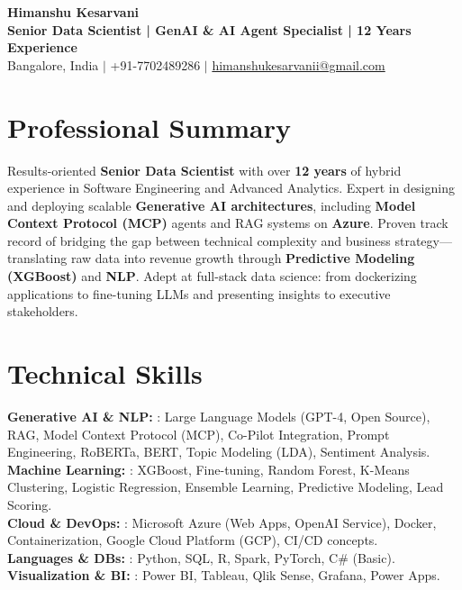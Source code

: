 \documentclass[10pt,a4paper]{article}
\begin{document}
\begin{center}
    {\Huge \bfseries \color{headerblue} Himanshu Kesarvani} \\ \vspace{4pt}
    \textbf{Senior Data Scientist | GenAI \& AI Agent Specialist | 12 Years Experience} \\ \vspace{4pt}
    \small 
    \faMapMarker Bangalore, India $|$ 
    \faPhone +91-7702489286 $|$ 
    \faEnvelope \href{mailto:himanshukesarvanii@gmail.com}{himanshukesarvanii@gmail.com} \\
\end{center}

\section{Professional Summary}
\small Results-oriented \textbf{Senior Data Scientist} with over \textbf{12 years} of hybrid experience in Software Engineering and Advanced Analytics. Expert in designing and deploying scalable \textbf{Generative AI architectures}, including \textbf{Model Context Protocol (MCP)} agents and RAG systems on \textbf{Azure}. Proven track record of bridging the gap between technical complexity and business strategy—translating raw data into revenue growth through \textbf{Predictive Modeling (XGBoost)} and \textbf{NLP}. Adept at full-stack data science: from dockerizing applications to fine-tuning LLMs and presenting insights to executive stakeholders.

\section{Technical Skills}
\begin{itemize}[leftmargin=0.15in, label={}]
    \small{\item{
     \textbf{Generative AI \& NLP:} {: Large Language Models (GPT-4, Open Source), RAG, Model Context Protocol (MCP), Co-Pilot Integration, Prompt Engineering, RoBERTa, BERT, Topic Modeling (LDA), Sentiment Analysis.} \\
     \textbf{Machine Learning:} {: XGBoost, Fine-tuning, Random Forest, K-Means Clustering, Logistic Regression, Ensemble Learning, Predictive Modeling, Lead Scoring.} \\
     \textbf{Cloud \& DevOps:} {: Microsoft Azure (Web Apps, OpenAI Service), Docker, Containerization, Google Cloud Platform (GCP), CI/CD concepts.} \\
     \textbf{Languages \& DBs:} {: Python, SQL, R, Spark, PyTorch, C\# (Basic).} \\
     \textbf{Visualization \& BI:} {: Power BI, Tableau, Qlik Sense, Grafana, Power Apps.}
    }}
\end{itemize}
\end{document}
